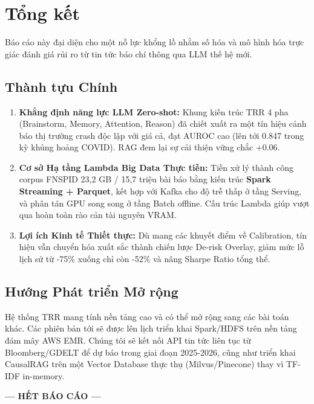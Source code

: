 \documentclass[11pt, a4paper]{article}
\begin{document}
\section{Tổng kết}

Báo cáo này đại diện cho một nỗ lực khổng lồ nhằm số hóa và mô hình hóa trực giác đánh giá rủi ro từ tin tức báo chí thông qua LLM thế hệ mới.

\subsection{Thành tựu Chính}
\begin{enumerate}
    \item \textbf{Khẳng định năng lực LLM Zero-shot:} Khung kiến trúc TRR 4 pha (Brainstorm, Memory, Attention, Reason) đã chiết xuất ra một tín hiệu cảnh báo thị trường crash độc lập với giá cả, đạt AUROC cao (lên tới 0.847 trong kỳ khủng hoảng COVID). RAG đem lại sự cải thiện vững chắc $+0.06$.
    \item \textbf{Cơ sở Hạ tầng Lambda Big Data Thực tiễn:} Tiền xử lý thành công corpus FNSPID 23,2 GB / 15,7 triệu bài báo bằng kiến trúc \textbf{Spark Streaming + Parquet}, kết hợp với Kafka cho độ trễ thấp ở tầng Serving, và phân tán GPU song song ở tầng Batch offline. Cấu trúc Lambda giúp vượt qua hoàn toàn rào cản tài nguyên VRAM.
    \item \textbf{Lợi ích Kinh tế Thiết thực:} Dù mang các khuyết điểm về Calibration, tín hiệu vẫn chuyển hóa xuất sắc thành chiến lược De-risk Overlay, giảm mức lỗ lịch sử từ -75\% xuống chỉ còn -52\% và nâng Sharpe Ratio tổng thể.
\end{enumerate}

\subsection{Hướng Phát triển Mở rộng}
Hệ thống TRR mang tính nền tảng cao và có thể mở rộng sang các bài toán khác. Các phiên bản tới sẽ được lên lịch triển khai Spark/HDFS trên nền tảng đám mây AWS EMR. Chúng tôi sẽ kết nối API tin tức liên tục từ Bloomberg/GDELT để dự báo trong giai đoạn 2025-2026, cũng như triển khai CausalRAG trên một Vector Database thực thụ (Milvus/Pinecone) thay vì TF-IDF in-memory.

\vspace{1cm}
\begin{center}
\textbf{--- HẾT BÁO CÁO ---}
\end{center}
\end{document}
